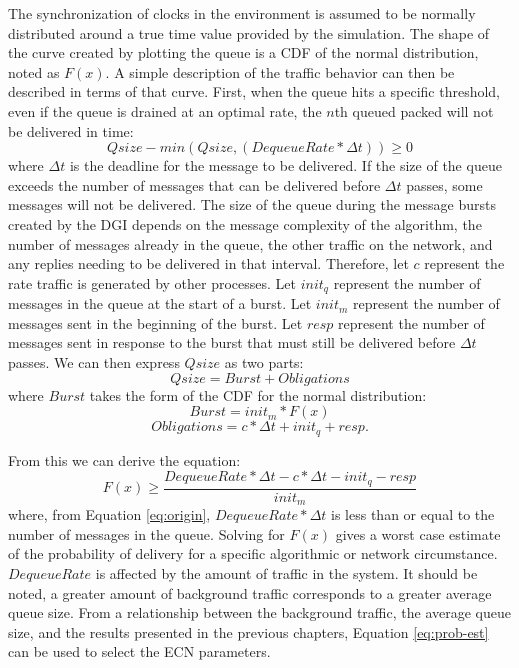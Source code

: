 The synchronization of clocks in the environment is assumed to be normally distributed around a true time value provided by the simulation.
The shape of the curve created by plotting the queue is a \ac{CDF} of the normal distribution, noted as $F(x)$.
A simple description of the traffic behavior can then be described in terms of that curve.
First, when the queue hits a specific threshold, even if the queue is drained at an optimal rate, the $n$th queued packed will not be delivered in time:
\begin{equation}
Qsize - min(Qsize, (DequeueRate * \Delta t)) \geq 0
\label{eq:origin}
\end{equation}%
where $\Delta t$ is the deadline for the message to be delivered.
If the size of the queue exceeds the number of messages that can be delivered before $\Delta t$ passes, some messages will not be delivered.
The size of the queue during the message bursts created by the DGI depends on the message complexity of the algorithm, the number of messages already in the queue, the other traffic on the network, and any replies needing to be delivered in that interval.
Therefore, let $c$ represent the rate traffic is generated by other processes.
Let $init_q$ represent the number of messages in the queue at the start of a burst. 
Let $init_m$ represent the number of messages sent in the beginning of the burst.
Let $resp$ represent the number of messages sent in response to the burst that must still be delivered before $\Delta t$ passes.
We can then express $Qsize$ as two parts:
\begin{equation}
Qsize = Burst + Obligations
\end{equation}%
where $Burst$ takes the form of the \ac{CDF} for the normal distribution:
\begin{equation}
Burst = init_m * F(x)  
\end{equation}
\begin{equation}
Obligations = c * \Delta t + init_q + resp.
\end{equation}

From this we can derive the equation:
\begin{equation}
F(x) \geq \frac{DequeueRate * \Delta t - c * \Delta t - init_q - resp}{init_m}
\label{eq:prob-est}
\end{equation}%
where, from Equation \ref{eq:origin}, $DequeueRate * \Delta t$ is less than or equal to the number of messages in the queue. 
Solving for $F(x)$ gives a worst case estimate of the probability of delivery for a specific algorithmic or network circumstance.
$DequeueRate$ is affected by the amount of traffic in the system. 
It should be noted, a greater amount of background traffic corresponds to a greater average queue size.
From a relationship between the background traffic, the average queue size, and the results presented in the previous chapters, Equation \ref{eq:prob-est} can be used to select the ECN parameters.

